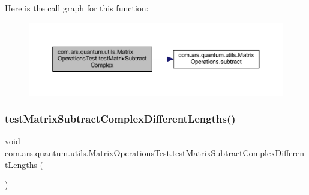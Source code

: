 Here is the call graph for this function\+:\nopagebreak
\begin{figure}[H]
\begin{center}
\leavevmode
\includegraphics[width=350pt]{classcom_1_1ars_1_1quantum_1_1utils_1_1_matrix_operations_test_a7b8069b3de70b2eb9d655eb142002d0b_cgraph}
\end{center}
\end{figure}
\hypertarget{classcom_1_1ars_1_1quantum_1_1utils_1_1_matrix_operations_test_af0c58a11a8b195509365a0f786041c86}{}\label{classcom_1_1ars_1_1quantum_1_1utils_1_1_matrix_operations_test_af0c58a11a8b195509365a0f786041c86} 
\subsubsection{\texorpdfstring{test\+Matrix\+Subtract\+Complex\+Different\+Lengths()}{testMatrixSubtractComplexDifferentLengths()}}
{\footnotesize\ttfamily void com.\+ars.\+quantum.\+utils.\+Matrix\+Operations\+Test.\+test\+Matrix\+Subtract\+Complex\+Different\+Lengths (\begin{DoxyParamCaption}{ }\end{DoxyParamCaption})}

